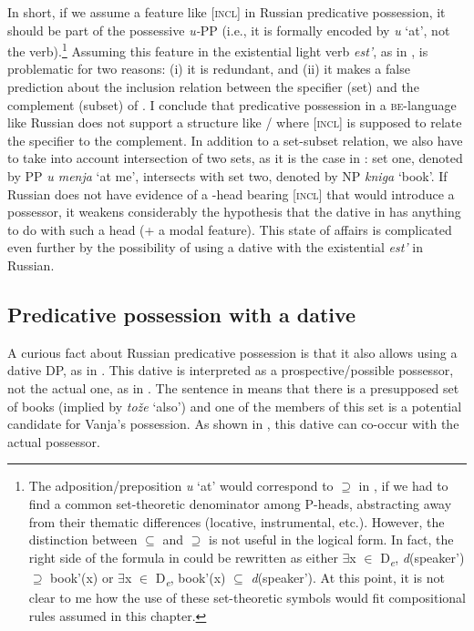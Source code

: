 \documentclass[output=paper,colorlinks,citecolor=brown,modfonts,nonflat]{langsci/langscibook}
\begin{document}
\largerpage
In short, if we assume a feature like [\textsc{incl}] in Russian predicative possession, it should be part of the possessive \textit{u-}PP (i.e., it is formally encoded by \textit{u} ‘at’, not the verb).\footnote{The adposition/preposition \textit{u} ‘at’ would correspond to \textrm{${\supseteq}$} in , if we had to find a common set-theoretic denominator among P-heads, abstracting away from their thematic differences (locative, instrumental, etc.). However, the distinction between \textrm{${\subseteq}$} and \textrm{${\supseteq}$} is not useful in the logical form. In fact, the right side of the formula in  could be rewritten as either \textrm{${\exists}$}x \textrm{${\in}$} D\textit{\textsubscript{e}}, \textit{d}(speaker\textrm{'}) \textrm{${\supseteq}$} book\textrm{'}(x) or \textrm{${\exists}$}x \textrm{${\in}$} D\textit{\textsubscript{e}}, book\textrm{'}(x) \textrm{${\subseteq}$} \textit{d}(speaker\textrm{'}). At this point, it is not clear to me how the use of these set-theoretic symbols would fit compositional rules assumed in this chapter.}  Assuming this feature in the existential light verb \textit{est’}, as in , is problematic for two reasons: (i) it is redundant, and (ii) it makes a false prediction about the inclusion relation between the specifier (set) and the complement (subset) of {\liv}. I conclude that predicative possession in a \textsc{be}{}-language like Russian does not support a structure like / where [\textsc{incl}] is supposed to relate the specifier to the complement. In addition to a set-subset relation, we also have to take into account intersection of two sets, as it is the case in : set one, denoted by PP \textit{u menja} ‘at me’, intersects with set two, denoted by NP \textit{kniga} ‘book’. If Russian does not have evidence of a {\liv}-head bearing [\textsc{incl}] that would introduce a possessor, it weakens considerably the hypothesis that the dative in  has anything to do with such a head (+ a modal feature). This state of affairs is complicated even further by the possibility of using a dative with the existential \textit{est’} in Russian.

\subsection{Predicative possession with a dative}\label{sec:tsedryk:2.3}

A curious fact about Russian predicative possession is that it also allows using a dative DP, as in . This dative is interpreted as a prospective/possible possessor, not the actual one, as in . The sentence in  means that there is a presupposed set of books (implied by \textit{tože} ‘also’) and one of the members of this set is a potential candidate for Vanja’s possession. As shown in , this dative can co-occur with the actual possessor.
\end{document}
